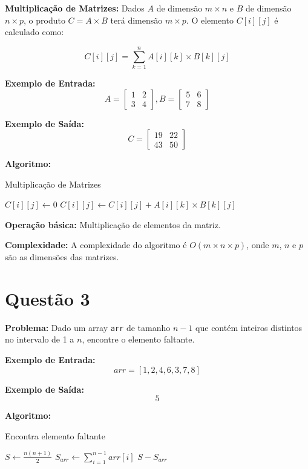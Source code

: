 \documentclass[12pt]{article}
\begin{document}
\textbf{Multiplicação de Matrizes:} Dados \(A\) de dimensão \(m \times n\) e \(B\) de dimensão \(n \times p\), o produto \(C = A \times B\) terá dimensão \(m \times p\). O elemento \(C[i][j]\) é calculado como:

\[
C[i][j] = \sum_{k=1}^{n} A[i][k] \times B[k][j]
\]

\textbf{Exemplo de Entrada:}
\[
A = \begin{bmatrix}
1 & 2 \\
3 & 4
\end{bmatrix},
B = \begin{bmatrix}
5 & 6 \\
7 & 8
\end{bmatrix}
\]

\textbf{Exemplo de Saída:}
\[
C = \begin{bmatrix}
19 & 22 \\
43 & 50
\end{bmatrix}
\]

\textbf{Algoritmo:}
\begin{algorithm}
\caption{Multiplicação de Matrizes}
\begin{algorithmic}[1]
            \State $C[i][j] \gets 0$
                \State $C[i][j] \gets C[i][j] + A[i][k] \times B[k][j]$
            \EndFor
        \EndFor
    \EndFor
\EndProcedure
\end{algorithmic}
\end{algorithm}

\textbf{Operação básica:} Multiplicação de elementos da matriz.

\textbf{Complexidade:} A complexidade do algoritmo é $O(m \times n \times p)$, onde $m$, $n$ e $p$ são as dimensões das matrizes.

\newpage

\section*{Questão 3}
\textbf{Problema:} Dado um array \texttt{arr} de tamanho \(n-1\) que contém inteiros distintos no intervalo de 1 a \(n\), encontre o elemento faltante.

\textbf{Exemplo de Entrada:}
\[
arr = [1, 2, 4, 6, 3, 7, 8]
\]

\textbf{Exemplo de Saída:}
\[
5
\]

\textbf{Algoritmo:}
\begin{algorithm}
\caption{Encontra elemento faltante}
\begin{algorithmic}[1]
    \State $S \gets \frac{n(n+1)}{2}$ 
    \State $S_{arr} \gets \sum_{i=1}^{n-1} arr[i]$
    \State \Return $S - S_{arr}$
\EndProcedure
\end{algorithmic}
\end{algorithm}
\end{document}

